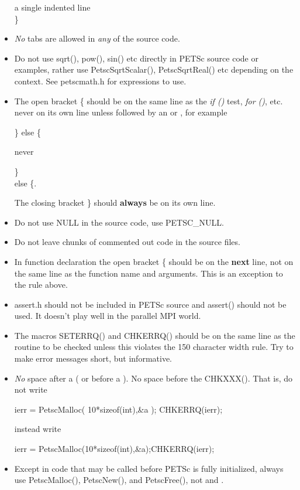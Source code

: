 \documentclass[twoside,12pt]{../sty/report_petsc}
\begin{document}
\begin{itemize}
\begin{tabbing}
     \>a single indented line\\
   \}
\end{tabbing}
\item {\em No} tabs are allowed in {\em any} of the source code.
\item Do not use sqrt(), pow(), sin() etc directly in PETSc source code or examples, rather use PetscSqrtScalar(), PetscSqrtReal() etc depending on the context. See petscmath.h for expressions to use.
\item The open bracket \{ should be on the same line as the {\em if ()} test, {\em for ()}, etc. never on
      its own line unless followed by an  or , for example
\begin{tabbing}
   \} else \{ \\
\end{tabbing}
never
\begin{tabbing}
   \} \\
   else \{.
\end{tabbing}
 The closing bracket \} should {\bf always} be on its own line.
\item Do not use NULL in the source code, use PETSC\_NULL.
\item Do not leave chunks of commented out code in the source files.
\item In function declaration the open bracket \{ should be on the {\bf next} line, not on the same line as the function name and
      arguments. This is an exception to the rule above.
\item assert.h should not be included in PETSc source and assert() should not be used. It doesn't play well in the parallel MPI world.
\item The macros SETERRQ() and CHKERRQ() should be on the
      same line as the routine to be checked unless this violates the
      150 character width rule. Try to make error messages short, but
      informative.
\item {\em No} space after a ( or before a ). No space before the CHKXXX(). That is, do not write
\begin{tabbing}
   ierr = PetscMalloc( 10*sizeof(int),\&a ); CHKERRQ(ierr);
\end{tabbing}
instead write
\begin{tabbing}
   ierr = PetscMalloc(10*sizeof(int),\&a);CHKERRQ(ierr);
\end{tabbing}
\item Except in code that may be called before PETSc is fully initialized, always use PetscMalloc(), PetscNew(), and PetscFree(), not  and .

\end{itemize}
\end{document}
